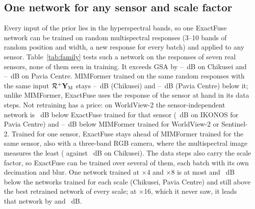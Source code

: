 \documentclass[journal]{IEEEtran}
\begin{document}
\subsection{One network for any sensor and scale factor}
Every input of the prior lies in the hyperspectral bands, so one ExactFuse network can be trained on random multispectral responses (3--10 bands of random position and width, a new response for every batch) and applied to any sensor. Table~\ref{tab:family} tests such a network on the responses of seven real sensors, none of them seen in training. It exceeds GSA by --~dB on Chikusei and --~dB on Pavia Centre. MIMFormer trained on the same random responses with the same input $\mathcal{R}^{+}\mathbf{Y}_{\mathrm{M}}$ stays --~dB (Chikusei) and --~dB (Pavia Centre) below it; unlike MIMFormer, ExactFuse uses the response of the sensor at hand in its data steps. Not retraining has a price: on WorldView-2 the sensor-independent network is ~dB below ExactFuse trained for that sensor (~dB on IKONOS for Pavia Centre) and --~dB below MIMFormer trained for WorldView-2 or Sentinel-2. Trained for one sensor, ExactFuse stays ahead of MIMFormer trained for the same sensor, also with a three-band RGB camera, where the multispectral image measures the least ( against ~dB on Chikusei). The data steps also carry the scale factor, so ExactFuse can be trained over several of them, each batch with its own decimation and blur. One network trained at $\times$4 and $\times$8 is at most  and ~dB below the networks trained for each scale (Chikusei, Pavia Centre) and still above the best retrained network of every scale; at $\times$16, which it never saw, it leads that network by  and ~dB.

\end{document}

